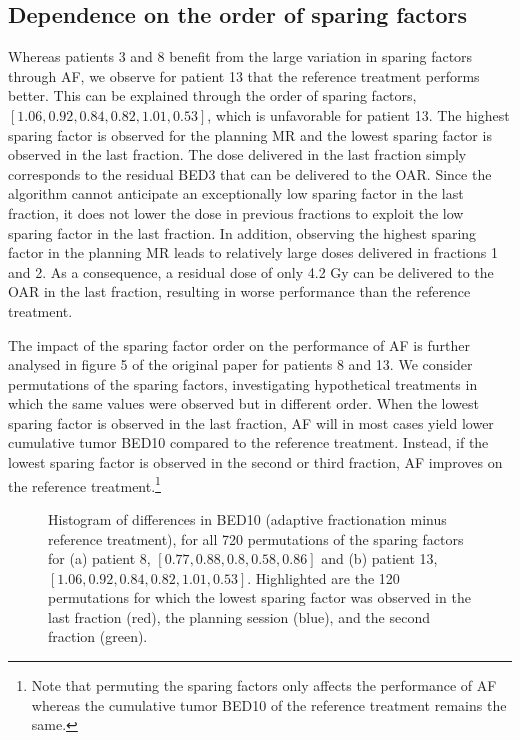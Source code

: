 \documentclass[11pt]{article}
\begin{document}
\subsection{Dependence on the order of sparing factors}

Whereas patients 3 and 8 benefit from the large variation in sparing factors through AF, we observe for patient 13 that the reference treatment performs better. This can be explained through the order of sparing factors, $[1.06, 0.92, 0.84, 0.82, 1.01, 0.53]$, which is unfavorable for patient 13. The highest sparing factor is observed for the planning MR and the lowest sparing factor is observed in the last fraction. The dose delivered in the last fraction simply corresponds to the residual BED3 that can be delivered to the OAR. Since the algorithm cannot anticipate an exceptionally low sparing factor in the last fraction, it does not lower the dose in previous fractions to exploit the low sparing factor in the last fraction. In addition, observing the highest sparing factor in the planning MR leads to relatively large doses delivered in fractions 1 and 2. As a consequence, a residual dose of only 4.2 Gy can be delivered to the OAR in the last fraction, resulting in worse performance than the reference treatment.

The impact of the sparing factor order on the performance of AF is further analysed in figure 5 of the original paper for patients 8 and 13. We consider permutations of the sparing factors, investigating hypothetical treatments in which the same values were observed but in different order. When the lowest sparing factor is observed in the last fraction, AF will in most cases yield lower cumulative tumor BED10 compared to the reference treatment. Instead, if the lowest sparing factor is observed in the second or third fraction, AF improves on the reference treatment.\footnote{Note that permuting the sparing factors only affects the performance of AF whereas the cumulative tumor BED10 of the reference treatment remains the same.}

\begin{figure}[ht]
\centering
{}
\caption{Histogram of differences in BED10 (adaptive fractionation minus reference treatment), for all 720 permutations of the sparing factors for (a) patient 8, $[0.77, 0.88, 0.8, 0.58, 0.86]$ and (b) patient 13, $[1.06, 0.92, 0.84, 0.82, 1.01, 0.53]$. Highlighted are the 120 permutations for which the lowest sparing factor was observed in the last fraction (red), the planning session (blue), and the second fraction (green).}
\label{fig:permutations}
\end{figure}
\end{document}
